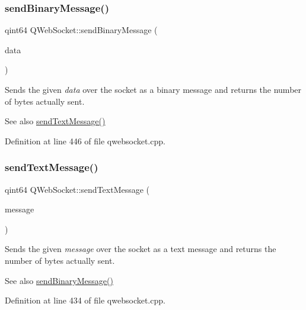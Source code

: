 \subsubsection{\texorpdfstring{send\+Binary\+Message()}{sendBinaryMessage()}}
{\footnotesize\ttfamily qint64 Q\+Web\+Socket\+::send\+Binary\+Message (\begin{DoxyParamCaption}\item[{const Q\+Byte\+Array \&}]{data }\end{DoxyParamCaption})}



Sends the given {\itshape data} over the socket as a binary message and returns the number of bytes actually sent. 

\begin{DoxySeeAlso}{See also}
\mbox{\hyperlink{class_q_web_socket_aa3bdc1e29c50c1e0d88c0977eb298a17}{send\+Text\+Message()}} 
\end{DoxySeeAlso}


Definition at line 446 of file qwebsocket.\+cpp.

\mbox{\label{class_q_web_socket_aa3bdc1e29c50c1e0d88c0977eb298a17}} 
\subsubsection{\texorpdfstring{send\+Text\+Message()}{sendTextMessage()}}
{\footnotesize\ttfamily qint64 Q\+Web\+Socket\+::send\+Text\+Message (\begin{DoxyParamCaption}\item[{const Q\+String \&}]{message }\end{DoxyParamCaption})}



Sends the given {\itshape message} over the socket as a text message and returns the number of bytes actually sent. 

\begin{DoxySeeAlso}{See also}
\mbox{\hyperlink{class_q_web_socket_aa56992d89ffba061ec6dc7c3e4a010f6}{send\+Binary\+Message()}} 
\end{DoxySeeAlso}


Definition at line 434 of file qwebsocket.\+cpp.

\mbox{\label{class_q_web_socket_a3f0e24c3101e75a42264aa527936573e}} 
